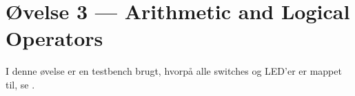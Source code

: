 \section{Øvelse 3 --- Arithmetic and Logical Operators}

I denne øvelse er en testbench brugt, hvorpå alle switches og LED'er er mappet til, se .



